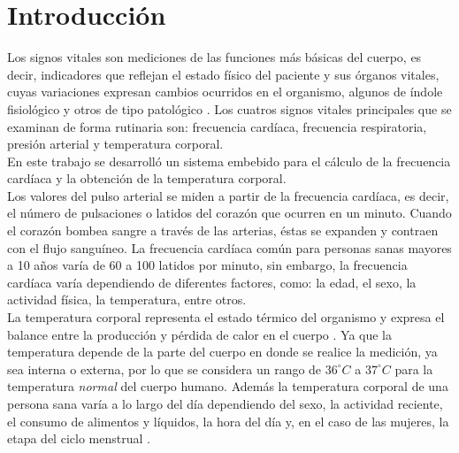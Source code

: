 \documentclass[journal]{IEEEtran}
\begin{document}
\section{Introducción}
% 
% 
% 
% 
Los signos vitales son mediciones de las funciones más básicas del cuerpo, es decir, indicadores que reflejan el estado físico del paciente y sus órganos vitales, cuyas variaciones expresan cambios ocurridos en el organismo, algunos de índole fisiológico y otros de tipo patológico \cite{aguayoChile} \cite{cobo2011}. Los cuatros signos vitales principales que se examinan de forma rutinaria son: frecuencia cardíaca, frecuencia respiratoria, presión arterial y temperatura corporal. \\

En este trabajo se desarrolló un sistema embebido para el cálculo de la frecuencia cardíaca y la obtención de la temperatura corporal. \\

Los valores del pulso arterial se miden a partir de la frecuencia cardíaca, es decir, el número de pulsaciones o latidos del corazón que ocurren en un minuto. Cuando el corazón bombea sangre a través de las arterias, éstas se expanden y contraen con el flujo sanguíneo. La frecuencia cardíaca común para personas sanas mayores a 10 años varía de 60 a 100 latidos por minuto, sin embargo, la frecuencia cardíaca varía dependiendo de diferentes factores, como: la edad, el sexo, la actividad física, la temperatura, entre otros. \cite{valoresFreq} \\

La temperatura corporal representa el estado térmico del organismo y expresa el balance entre la producción y pérdida de calor en el cuerpo \cite{cobo2011}. Ya que la temperatura depende de la parte del cuerpo en donde se realice la medición, ya sea interna o externa, por lo que se considera un rango de $36^{\circ}C$ a $37^{\circ}C$ para la temperatura \textit{normal} del cuerpo humano. Además la temperatura corporal de una persona sana varía a lo largo del día dependiendo del sexo, la actividad reciente, el consumo de alimentos y líquidos, la hora del día y, en el caso de las mujeres, la etapa del ciclo menstrual \cite{signosvitales2016}. \\
\end{document}
